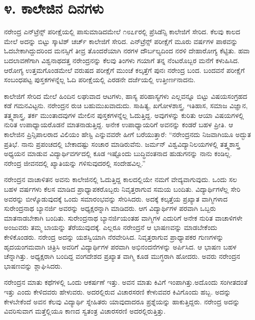 
\chapter*{೪. ಕಾಲೇಜಿನ ದಿನಗಳು}

ನರೇಂದ್ರ ಎನ್‍ಟ್ರೆನ್ಸ್ ಪರೀಕ್ಷೆಯಲ್ಲಿ ಪಾಸುಮಾಡಿದಮೇಲೆ ೧೮೭೯ರಲ್ಲಿ ಪ್ರೆಸಿಡೆನ್ಸಿ ಕಾಲೇಜಿಗೆ ಸೇರಿದ. ಕೆಲವು ಕಾಲದ ಮೇಲೆ ಅದನ್ನು ಬಿಟ್ಟು ಸ್ಕಾಟಿಶ್ ಚರ್ಚ್ ಕಾಲೇಜಿಗೆ ಸೇರಿದ. ಎನ್‍ಟ್ರೆನ್ಸ್ ಪರೀಕ್ಷೆಗೆ ಮೂರು ವರ್ಷಗಳ ಪಾಠವನ್ನು ಓದಬೇಕಾಗಿದ್ದುದರಿಂದ ಮನಸ್ಸಿಗೆ ತೀವ್ರ ತೊಂದರೆಯಾಗಿ ನರಗಳ ದೌರ್ಬಲ್ಯದಿಂದ ನರಳಿ ದೇಹಾರೋಗ್ಯ ಕೆಟ್ಟಿತು. ಹವಾ ಬದಲಾವಣೆಗಾಗಿ ವಿಶ್ವನಾಥದತ್ತ ನರೇಂದ್ರನನ್ನು ಕೆಲವು ತಿಂಗಳು ಗಯಾಗೆ ತನ್ನ ನೆಂಟರೊಬ್ಬರ ಮನೆಗೆ ಕಳುಹಿಸಿದ. ಆರೋಗ್ಯ ಉತ್ತಮಗೊಂಡಮೇಲೆ ವರುಷದ ಪರೀಕ್ಷೆಗೆ ಮುಂಚೆ ಕಲ್ಕತ್ತೆಗೆ ಪುನಃ ನರೇಂದ್ರ ಬಂದ. ಬಂದವನೆ ಪರೀಕ್ಷೆಗೆ ಸಂಬಂಧಪಟ್ಟ ಪುಸ್ತಕಗಳನ್ನೆಲ್ಲ ಓದಿ ಪರೀಕ್ಷೆಯಲ್ಲಿ ಎರಡನೇ ದರ್ಜೆಯಲ್ಲಿ ಉತ್ತೀರ್ಣನಾದನು.

ಕಾಲೇಜಿಗೆ ಸೇರಿದ ಮೇಲೆ ಹಿಂದಿನ ಲಘುವಾದ ಆಟಗಳು, ಹಾಸ್ಯ ಪರಿಹಾಸ್ಯಗಳು ಎಲ್ಲವನ್ನೂ ಬಿಟ್ಟು ವಿಷಯಸಂಗ್ರಹದ ಕಡೆ ಗಮನವಿಟ್ಟನು. ನರೇಂದ್ರನ ರುಚಿ ಬಹುಮುಖವಾದುದು. ಸಾಹಿತ್ಯ, ಖಗೋಳಶಾಸ್ತ್ರ, ಇತಿಹಾಸ, ಸಮಾಜ ವಿಜ್ಞಾನ, ತತ್ತ್ವಶಾಸ್ತ್ರ, ತರ್ಕ ಮುಂತಾದವುಗಳ ಮೇಲಿನ ಪುಸ್ತಕಗಳನ್ನೆಲ್ಲ ಓದುತ್ತಿದ್ದ. ಅವುಗಳನ್ನು ಕುರಿತು ಆಯಾ ವಿಷಯಗಳಲ್ಲಿ ನುರಿತ ಉಪಾಧ್ಯಾಯರೊಡನೆ ಮಾತನಾಡುತ್ತಿದ್ದ. ಅನೇಕ ಉಪಾಧ್ಯಾಯರಿಗೆ ಅವನನ್ನು ಕಂಡರೆ ಬಹಳ ಪ್ರೀತಿ. ಆ ಕಾಲೇಜಿನ ಪ್ರಿನ್ಸಿಪಾಲರಾದ ವಿಲಿಯಂ ಹೇಸ್ಟಿ ಎನ್ನುವವರೇ ಹೀಗೆ ಬರೆಯುತ್ತಾರೆ: “ನರೇಂದ್ರನದು ನಿಜವಾಗಿಯೂ ಅದ್ಭುತ ಪ್ರತಿಭೆ. ನಾನು ಪ್ರಪಂಚದಲ್ಲಿ ಬೇಕಾದಷ್ಟು ಸಂಚಾರ ಮಾಡಿರುವೆನು. ಜರ್ಮನ್ ವಿಶ್ವವಿದ್ಯಾನಿಲಯಗಳಲ್ಲಿ ತತ್ತ್ವಶಾಸ್ತ್ರ ಅಧ್ಯಯನ ಮಾಡುವ ವಿದ್ಯಾರ್ಥಿವರ್ಗದಲ್ಲಿ ಕೂಡ ಇಷ್ಟೊಂದು ಬುದ್ಧಿವಂತನಾದ ಹುಡುಗನನ್ನು ನಾನು ಕಂಡಿಲ್ಲ. ನರೇಂದ್ರ ಜೀವನದಲ್ಲಿ ಖ್ಯಾತಿಯನ್ನು ಗಳಿಸುವುದರಲ್ಲಿ ಸಂದೇಹವಿಲ್ಲ.”

ನರೇಂದ್ರನ ವಾಚಾಳಿತನ ಅವನು ಕಾಲೇಜಿನಲ್ಲಿ ಓದುತ್ತಿದ್ದ ಕಾಲದಲ್ಲಿಯೇ ನಮಗೆ ವೇದ್ಯವಾಗುವುದು. ಒಂದು ಸಲ ಬಹಳ ವರ್ಷಗಳು ಕೆಲಸ ಮಾಡಿದ ಪ್ರಾಧ್ಯಾಪಕರೊಬ್ಬರು ನಿವೃತ್ತರಾಗುವ ಸಮಯ ಬಂದಿತು. ವಿದ್ಯಾರ್ಥಿಗಳೆಲ್ಲ ಸೇರಿ ಅವರನ್ನು ಬೀಳ್ಕೊಡುವುದಕ್ಕೆ ಒಂದು ಸಮಾರಂಭವನ್ನು ಸೇರಿಸಿದರು. ಅದಕ್ಕೆ ಕಲ್ಕತ್ತೆಯ ಪ್ರಖ್ಯಾತ ವಾಗ್ಮಿಗಳಾದ ಸುರೇಂದ್ರನಾಥ ಬ್ಯಾನರ್ಜಿ ಅವರನ್ನು ಅಧ್ಯಕ್ಷರನ್ನಾಗಿ ಮಾಡಿದರು. ಆಗ ವಿದ್ಯಾರ್ಥಿಗಳ ಪರವಾಗಿ ಒಬ್ಬರು ಮಾತನಾಡಬೇಕಾಗಿ ಬಂದಿತು. ಸುರೇಂದ್ರನಾಥ ಬ್ಯಾನರ್ಜಿಯಂತಹ ವಾಗ್ಮಿಗಳ ಎದುರಿಗೆ ಅನೇಕ ನುರಿತ ವಾಚಾಳಿಗಳೇ ಅಂಜುವರು ತಮ್ಮ ಬಾಯನ್ನು ತೆರೆಯುವುದಕ್ಕೆ. ಎಲ್ಲರೂ ನರೇಂದ್ರನೆ ಆ ಭಾಷಣವನ್ನು ಮಾಡಬೇಕೆಂದು ಕೇಳಿಕೊಂಡರು. ನರೇಂದ್ರ ಅದನ್ನು ಯಶಸ್ವಿಯಾಗಿ ನೆರವೇರಿಸಿದ. ನಿವೃತ್ತರಾಗುವ ಪ್ರಾಧ್ಯಾಪಕರ ಗುಣಗಳನ್ನು ಹೃದಯಂಗಮವಾಗಿ ಚಿತ್ರಿಸಿ ಅವರಿಗೆ ವಿದ್ಯಾರ್ಥಿಗಳ ಪರವಾಗಿ ಅಭಿನಂದನೆಗಳನ್ನು ಅರ್ಪಿಸಿದ. ಆ ಭಾಷಣ ಬಹಳ ಚೆನ್ನಾಗಿತ್ತು. ಅಧ್ಯಕ್ಷರಾಗಿ ಬಂದಿದ್ದ ವಂಗದೇಶದ ಪ್ರಖ್ಯಾತ ವಾಗ್ಮಿ ಕೂಡ ಮುಗ್ಧರಾಗಿ ಹೋದರು. ಅವರು ನರೇಂದ್ರನ ಭಾಷಣವನ್ನು ಶ್ಲಾಘಿಸಿದರು.

ನರೇಂದ್ರನ ಮಾತು ಕಥೆಗಳಲ್ಲಿ ಒಂದು ಆಕರ್ಷಣೆ ಇತ್ತು. ಅವನ ಮಾತು ಕಿವಿಗೆ ಇಂಪಾಗಿತ್ತು.ಅದೊಂದು ಸಂಗೀತದಂತೆ ಇತ್ತು ಎಂದು ಕೇಳಿದವರು ಹೇಳುವರು. ಅದರಲ್ಲಿರುವ ವಿಚಾರಸರಣಿ ಕೇಳುವವರ ಕಿವಿಗೊಂದು ಹಬ್ಬ. ಅದನ್ನು ಕೇಳಬೇಕೆಂದೆ ಅವನ ಕೆಲವು ವಿದ್ಯಾರ್ಥಿ ಸ್ನೇಹಿತರು ಯಾವುದಾದರೂ ಪ್ರಶ್ನೆಯನ್ನು ಹಾಕುತ್ತಿದ್ದರು. ನರೇಂದ್ರ ಅದನ್ನು ವಿವರಿಸುವಾಗ ಮತ್ತೆಲ್ಲಿಯೂ ಕಾಣದ ಸ್ವತಂತ್ರ ವಿಚಾರಸರಣಿ ಅದರಲ್ಲಿರುತ್ತಿತ್ತು.


